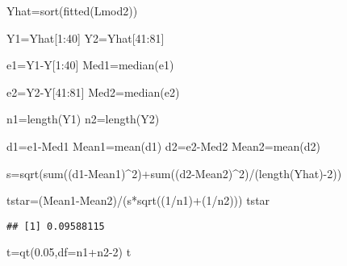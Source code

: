 \documentclass[
]{article}
\newenvironment{Shaded}{\begin{snugshade}}{\end{snugshade}}
\newcommand{\AttributeTok}[1]{\textcolor[rgb]{0.77,0.63,0.00}{#1}}
\newcommand{\DecValTok}[1]{\textcolor[rgb]{0.00,0.00,0.81}{#1}}
\newcommand{\FloatTok}[1]{\textcolor[rgb]{0.00,0.00,0.81}{#1}}
\newcommand{\FunctionTok}[1]{\textcolor[rgb]{0.00,0.00,0.00}{#1}}
\newcommand{\NormalTok}[1]{#1}
\newcommand{\OtherTok}[1]{\textcolor[rgb]{0.56,0.35,0.01}{#1}}
\newcommand{\SpecialCharTok}[1]{\textcolor[rgb]{0.00,0.00,0.00}{#1}}
\begin{document}
\begin{Shaded}
\begin{Highlighting}[]
\NormalTok{Yhat}\OtherTok{=}\FunctionTok{sort}\NormalTok{(}\FunctionTok{fitted}\NormalTok{(Lmod2))}

\NormalTok{Y1}\OtherTok{=}\NormalTok{Yhat[}\DecValTok{1}\SpecialCharTok{:}\DecValTok{40}\NormalTok{]}
\NormalTok{Y2}\OtherTok{=}\NormalTok{Yhat[}\DecValTok{41}\SpecialCharTok{:}\DecValTok{81}\NormalTok{]}

\NormalTok{e1}\OtherTok{=}\NormalTok{Y1}\SpecialCharTok{{-}}\NormalTok{Y[}\DecValTok{1}\SpecialCharTok{:}\DecValTok{40}\NormalTok{]}
\NormalTok{Med1}\OtherTok{=}\FunctionTok{median}\NormalTok{(e1)}

\NormalTok{e2}\OtherTok{=}\NormalTok{Y2}\SpecialCharTok{{-}}\NormalTok{Y[}\DecValTok{41}\SpecialCharTok{:}\DecValTok{81}\NormalTok{]}
\NormalTok{Med2}\OtherTok{=}\FunctionTok{median}\NormalTok{(e2)}

\NormalTok{n1}\OtherTok{=}\FunctionTok{length}\NormalTok{(Y1)}
\NormalTok{n2}\OtherTok{=}\FunctionTok{length}\NormalTok{(Y2)}


\NormalTok{d1}\OtherTok{=}\NormalTok{e1}\SpecialCharTok{{-}}\NormalTok{Med1}
\NormalTok{Mean1}\OtherTok{=}\FunctionTok{mean}\NormalTok{(d1)}
\NormalTok{d2}\OtherTok{=}\NormalTok{e2}\SpecialCharTok{{-}}\NormalTok{Med2}
\NormalTok{Mean2}\OtherTok{=}\FunctionTok{mean}\NormalTok{(d2)}

\NormalTok{s}\OtherTok{=}\FunctionTok{sqrt}\NormalTok{(}\FunctionTok{sum}\NormalTok{((d1}\SpecialCharTok{{-}}\NormalTok{Mean1)}\SpecialCharTok{\^{}}\DecValTok{2}\NormalTok{)}\SpecialCharTok{+}\FunctionTok{sum}\NormalTok{((d2}\SpecialCharTok{{-}}\NormalTok{Mean2)}\SpecialCharTok{\^{}}\DecValTok{2}\NormalTok{)}\SpecialCharTok{/}\NormalTok{(}\FunctionTok{length}\NormalTok{(Yhat)}\SpecialCharTok{{-}}\DecValTok{2}\NormalTok{))}

\NormalTok{tstar}\OtherTok{=}\NormalTok{(Mean1}\SpecialCharTok{{-}}\NormalTok{Mean2)}\SpecialCharTok{/}\NormalTok{(s}\SpecialCharTok{*}\FunctionTok{sqrt}\NormalTok{((}\DecValTok{1}\SpecialCharTok{/}\NormalTok{n1)}\SpecialCharTok{+}\NormalTok{(}\DecValTok{1}\SpecialCharTok{/}\NormalTok{n2)))}
\NormalTok{tstar}
\end{Highlighting}
\end{Shaded}

\begin{verbatim}
## [1] 0.09588115
\end{verbatim}

\begin{Shaded}
\begin{Highlighting}[]
\NormalTok{t}\OtherTok{=}\FunctionTok{qt}\NormalTok{(}\FloatTok{0.05}\NormalTok{,}\AttributeTok{df=}\NormalTok{n1}\SpecialCharTok{+}\NormalTok{n2}\DecValTok{{-}2}\NormalTok{)}
\NormalTok{t}
\end{Highlighting}
\end{Shaded}
\end{document}
